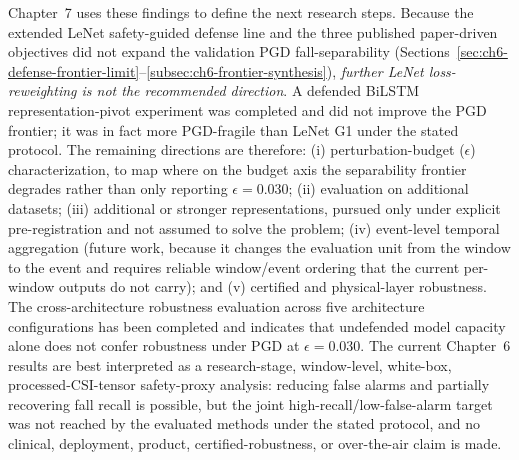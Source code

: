 Chapter~7 uses these findings to define the next research steps. Because the extended LeNet safety-guided
defense line and the three published paper-driven objectives did not expand the validation PGD
fall-separability (Sections~\ref{sec:ch6-defense-frontier-limit}--\ref{subsec:ch6-frontier-synthesis}),
\emph{further LeNet loss-reweighting is not the recommended direction}. A defended BiLSTM
representation-pivot experiment was completed and did not improve the PGD frontier; it was in fact more
PGD-fragile than LeNet G1 under the stated protocol. The remaining directions are therefore: (i) perturbation-budget
(\(\epsilon\)) characterization, to map where on the budget axis the separability frontier degrades rather
than only reporting \(\epsilon=0.030\); (ii) evaluation on additional datasets; (iii) additional or stronger
representations, pursued only under explicit pre-registration and not assumed to solve the problem; (iv)
event-level temporal aggregation (future work, because it changes the evaluation unit from the window to the
event and requires reliable window/event ordering that the current per-window outputs do not carry); and (v)
certified and physical-layer robustness. The cross-architecture robustness evaluation across five
architecture configurations has been completed and indicates that undefended model capacity alone does not
confer robustness under PGD at \(\epsilon=0.030\). The current Chapter~6 results are best interpreted as a
research-stage, window-level, white-box, processed-CSI-tensor safety-proxy analysis: reducing false alarms
and partially recovering fall recall is possible, but the joint high-recall/low-false-alarm target was not
reached by the evaluated methods under the stated protocol, and no clinical, deployment, product,
certified-robustness, or over-the-air claim is made.
